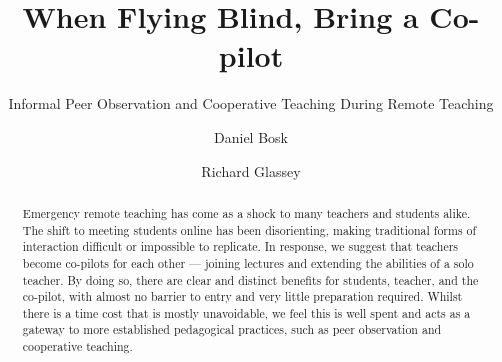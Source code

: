 \documentclass[sigconf,natbib=false]{acmart}
\begin{document}
\title{When Flying Blind, Bring a Co-pilot}
\subtitle{Informal Peer Observation and Cooperative Teaching During Remote Teaching}


\author{Daniel Bosk}
\orcid{}

\author{Richard Glassey}
\orcid{}


\begin{abstract}

Emergency remote teaching has come as a shock to many teachers and students alike. The shift to meeting students online has been disorienting, making traditional forms of interaction difficult or impossible to replicate. In response, we suggest that teachers become co-pilots for each other --- joining lectures and extending the abilities of a solo teacher. By doing so, there are clear and distinct benefits for students, teacher, and the co-pilot, with almost no barrier to entry and very little preparation required. Whilst there is a time cost that is mostly unavoidable, we feel this is well spent and acts as a gateway to more established pedagogical practices, such as peer observation and cooperative teaching.

\end{abstract}

\begin{CCSXML}

\end{CCSXML}
\end{document}
